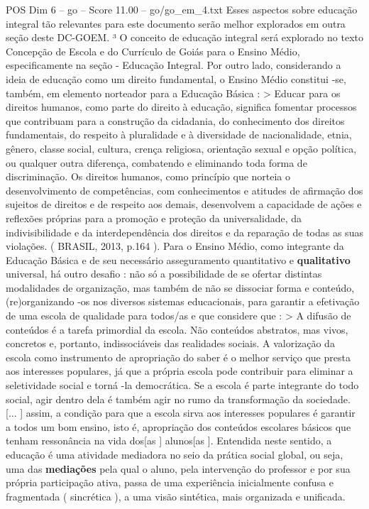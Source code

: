 \begin{textsample}{POS Dim 6 – go – Score 11.00 – go/go\_em\_4.txt}
Esses aspectos sobre educação integral tão relevantes para este documento serão melhor explorados em outra seção deste DC-GOEM. ³ O conceito de educação integral será explorado no texto Concepção de Escola e do Currículo de Goiás para o Ensino Médio, especificamente na seção - Educação Integral.
Por outro lado, considerando a ideia de educação como um direito fundamental, o Ensino Médio constitui -se, também, em elemento norteador para a Educação Básica : > Educar para os direitos humanos, como parte do direito à educação, significa fomentar processos que contribuam para a construção da cidadania, do conhecimento dos direitos fundamentais, do respeito à pluralidade e à diversidade de nacionalidade, etnia, gênero, classe social, cultura, crença religiosa, orientação sexual e opção política, ou qualquer outra diferença, combatendo e eliminando toda forma de discriminação.
Os direitos humanos, como princípio que norteia o desenvolvimento de competências, com conhecimentos e atitudes de afirmação dos sujeitos de direitos e de respeito aos demais, desenvolvem a capacidade de ações e reflexões próprias para a promoção e proteção da universalidade, da indivisibilidade e da interdependência dos direitos e da reparação de todas as suas violações. ( BRASIL, 2013, p.164 ).
Para o Ensino Médio, como integrante da Educação Básica e de seu necessário asseguramento quantitativo e \textbf{qualitativo} universal, há outro desafio : não só a possibilidade de se ofertar distintas modalidades de organização, mas também de não se dissociar forma e conteúdo, (re)organizando -os nos diversos sistemas educacionais, para garantir a efetivação de uma escola de qualidade para todos/as e que considere que : > A difusão de conteúdos é a tarefa primordial da escola.
Não conteúdos abstratos, mas vivos, concretos e, portanto, indissociáveis das realidades sociais.
A valorização da escola como instrumento de apropriação do saber é o melhor serviço que presta aos interesses populares, já que a própria escola pode contribuir para eliminar a seletividade social e torná -la democrática.
Se a escola é parte integrante do todo social, agir dentro dela é também agir no rumo da transformação da sociedade. [... ] assim, a condição para que a escola sirva aos interesses populares é garantir a todos um bom ensino, isto é, apropriação dos conteúdos escolares básicos que tenham ressonância na vida dos[as ] alunos[as ].
Entendida neste sentido, a educação é uma atividade mediadora no seio da prática social global, ou seja, uma das \textbf{mediações} pela qual o aluno, pela intervenção do professor e por sua própria participação ativa, passa de uma experiência inicialmente confusa e fragmentada ( sincrética ), a uma visão sintética, mais organizada e unificada.

\end{textsample}
